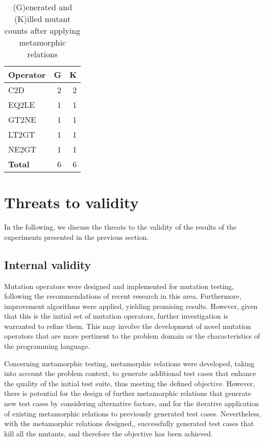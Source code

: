 

\begin{table}
    \centering
    \begin{tabular}{lrr}
    \toprule
    \textbf{Operator} & \textbf{G} &  \textbf{K} \\
    \midrule
C2D         & 2 & 2 \\
EQ2LE   & 1     & 1 \\
GT2NE   & 1     & 1 \\
LT2GT   & 1     & 1 \\
NE2GT   & 1     & 1 \\

    \midrule
    \textbf{Total} & 6 & 6  \\
    \bottomrule
    \end{tabular}
    \caption{(G)enerated and (K)illed mutant counts after applying metamorphic relations}
    \label{tab:mutant-counts2}
\end{table}


\section{Threats to validity}
\label{sec:threat}
In the following, we discuss the threats to the validity of the results of the experiments presented in the
previous section.

\subsection{Internal validity}
Mutation operators were designed and implemented for mutation testing, following the recommendations of recent research in this area. Furthermore, improvement algorithms were applied, yielding promising results. However, given that this is the initial set of mutation operators, further investigation is warranted to refine them. This may involve the development of novel mutation operators that are more pertinent to the problem domain or the characteristics of the programming language.

Concerning metamorphic testing, metamorphic relations were developed, taking into account the problem context, to generate additional test cases that enhance the quality of the initial test suite, thus meeting the defined objective. However, there is potential for the design of further metamorphic relations that generate new test cases by considering alternative factors, and for the iterative application of existing metamorphic relations to previously generated test cases. Nevertheless, with the metamorphic relations designed,, successfully generated test cases that kill all the mutants, and therefore the objective has been achieved.

